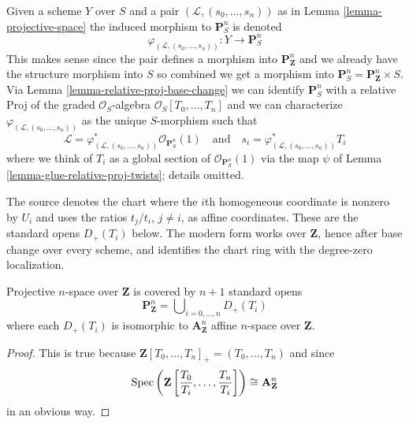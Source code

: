 \noindent
Given a scheme $Y$ over $S$
and a pair $(\mathcal{L}, (s_0, \ldots, s_n))$ as in
Lemma \ref{lemma-projective-space}
the induced morphism to $\mathbf{P}^n_S$ is denoted
$$
\varphi_{(\mathcal{L}, (s_0, \ldots, s_n))} :
Y \longrightarrow \mathbf{P}^n_S
$$
This makes sense since the pair defines a morphism into
$\mathbf{P}^n_{\mathbf{Z}}$ and we already have the structure
morphism into $S$ so combined we get a morphism into
$\mathbf{P}^n_S = \mathbf{P}^n_{\mathbf{Z}} \times S$.
Via Lemma \ref{lemma-relative-proj-base-change}
we can identify $\mathbf{P}^n_S$ with a relative Proj of
the graded $\mathcal{O}_S$-algebra $\mathcal{O}_S[T_0, \ldots, T_n]$
and we can characterize $\varphi_{(\mathcal{L}, (s_0, \ldots, s_n))}$
as the unique $S$-morphism such that
$$
\mathcal{L} =
\varphi_{(\mathcal{L}, (s_0, \ldots, s_n))}^*\mathcal{O}_{\mathbf{P}^n_S}(1)
\quad
\text{and}
\quad
s_i = \varphi_{(\mathcal{L}, (s_0, \ldots, s_n))}^*T_i
$$
where we think of $T_i$ as a global section of
$\mathcal{O}_{\mathbf{P}^n_S}(1)$ via the map $\psi$ of
Lemma \ref{lemma-glue-relative-proj-twists}; details omitted.

\begin{lemma}
\label{lemma-standard-covering-projective-space}
\begin{reference}
\cite[Chapter III, \S 1, no. 51 and Proposition 1,
pp. 243--244]{FAC}
\end{reference}
\begin{history}
The source denotes the chart where the $i$th homogeneous coordinate is
nonzero by $U_i$ and uses the ratios $t_j/t_i$, $j \neq i$, as affine
coordinates. These are the standard opens $D_{+}(T_i)$ below. The modern
form works over $\mathbf{Z}$, hence after base change over every scheme, and
identifies the chart ring with the degree-zero localization.
\end{history}
Projective $n$-space over $\mathbf{Z}$ is covered by
$n + 1$ standard opens
$$
\mathbf{P}^n_{\mathbf{Z}} =
\bigcup\nolimits_{i = 0, \ldots, n} D_{+}(T_i)
$$
where each $D_{+}(T_i)$ is isomorphic to $\mathbf{A}^n_{\mathbf{Z}}$
affine $n$-space over $\mathbf{Z}$.
\end{lemma}

\begin{proof}
This is true because
$\mathbf{Z}[T_0, \ldots, T_n]_{+} = (T_0, \ldots, T_n)$ and
since
$$
\mathop{\mathrm{Spec}}
\left(
\mathbf{Z}
\left[\frac{T_0}{T_i}, \ldots, \frac{T_n}{T_i}
\right]
\right)
\cong
\mathbf{A}^n_{\mathbf{Z}}
$$
in an obvious way.
\end{proof}

